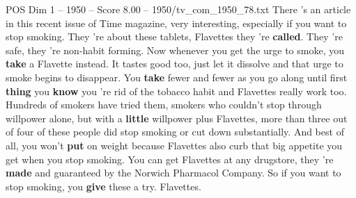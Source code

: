 \begin{textsample}{POS Dim 1 – 1950 – Score 8.00 – 1950/tv\_com\_1950\_78.txt}  \label{ex:f1_pos_016}
There 's an article in this recent issue of Time magazine, very interesting, especially if you want to stop smoking.
They 're about these tablets, Flavettes they 're \textbf{called}.
They 're safe, they 're non-habit forming.
Now whenever you get the urge to smoke, you \textbf{take} a Flavette instead.
It tastes good too, just let it dissolve and that urge to smoke begins to disappear.
You \textbf{take} fewer and fewer as you go along until first \textbf{thing} you \textbf{know} you 're rid of the tobacco habit and Flavettes really work too.
Hundreds of smokers have tried them, smokers who couldn't stop through willpower alone, but with a \textbf{little} willpower plus Flavettes, more than three out of four of these people did stop smoking or cut down substantially.
And best of all, you won't \textbf{put} on weight because Flavettes also curb that big appetite you get when you stop smoking.
You can get Flavettes at any drugstore, they 're \textbf{made} and guaranteed by the Norwich Pharmacol Company.
So if you want to stop smoking, you \textbf{give} these a try.
Flavettes.

\end{textsample}
